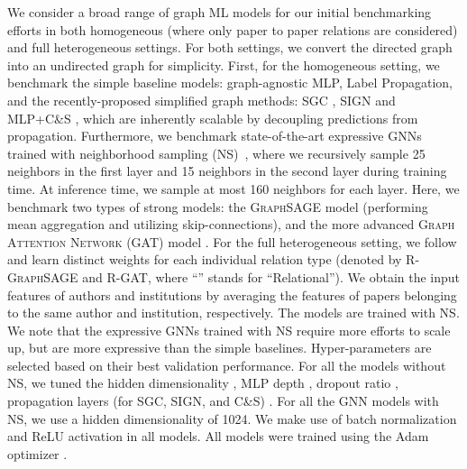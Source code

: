 \documentclass{article}
\begin{document}
{
We consider a broad range of graph ML models for our initial benchmarking efforts in both homogeneous (where only paper to paper relations are considered) and full heterogeneous settings.
For both settings, we convert the directed graph into an undirected graph for simplicity.
First, for the homogeneous setting, we benchmark the simple baseline models: graph-agnostic MLP, Label Propagation, and the recently-proposed simplified graph methods: \textsc{SGC} \citep{wu2019simplifying}, \textsc{SIGN} \citep{rossi2020sign} and \textsc{MLP+C\&S} \citep{huang2020combining}, which are inherently scalable by decoupling predictions from propagation.
Furthermore, we benchmark state-of-the-art expressive GNNs trained with neighborhood sampling (\textsc{NS})~\citep{hamilton2017inductive}, where we recursively sample 25 neighbors in the first layer and 15 neighbors in the second layer during training time. At inference time, we sample at most 160 neighbors for each layer.
Here, we benchmark two types of strong models: the \textsc{GraphSAGE} \citep{hamilton2017inductive} model (performing mean aggregation and utilizing skip-connections), and the more advanced \textsc{Graph Attention Network (GAT)} model \citep{velivckovic2017graph}.
For the full heterogeneous setting, we follow \citet{schlichtkrull2018modeling} and learn distinct weights for each individual relation type (denoted by \textsc{R-GraphSAGE} and \textsc{R-GAT}, where ``'' stands for ``Relational''). 
We obtain the input features of authors and institutions by averaging the features of papers belonging to the same author and institution, respectively.
The models are trained with \textsc{NS}.
We note that the expressive GNNs trained with \textsc{NS} require more efforts to scale up, but are more expressive than the simple baselines.
}
{
Hyper-parameters are selected based on their best validation performance.
For all the models without NS, we tuned the hidden dimensionality , MLP depth , dropout ratio , propagation layers (for \textsc{SGC}, \textsc{SIGN}, and \textsc{C\&S}) .
For all the GNN models with NS, we use a hidden dimensionality of 1024.
We make use of batch normalization \citep{ioffe2015batch} and ReLU activation in all models.
All models were trained using the Adam optimizer \citep{kingma2014adam}.
}
\end{document}
